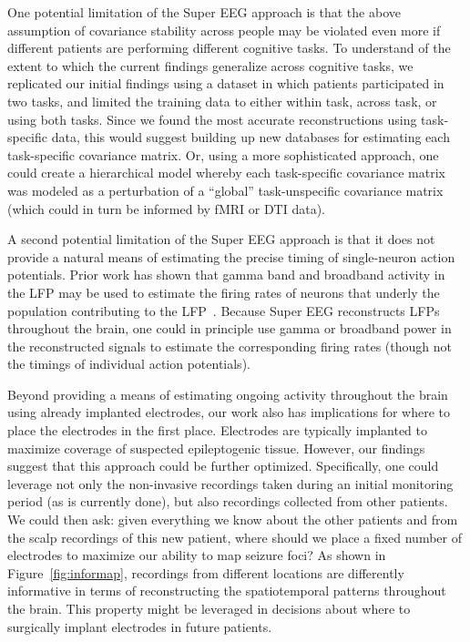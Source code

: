 \documentclass[12pt]{article}
\begin{document}
One potential limitation of the Super EEG approach is that the above
assumption of covariance stability across people may be violated even
more if different patients are performing different cognitive tasks.
To understand of the extent to which the current findings generalize across
cognitive tasks, we replicated our initial findings using a dataset in which patients participated in two tasks, and limited the training data to either within task, across task, or using both tasks. Since we found the most accurate reconstructions using task-specific data, this would suggest building up new databases for estimating each task-specific covariance
matrix.  Or, using a more sophisticated approach, one could create a
hierarchical model whereby each task-specific covariance matrix was
modeled as a perturbation of a ``global'' task-unspecific covariance
matrix (which could in turn be informed by fMRI or DTI data).

A second potential limitation of the Super EEG approach is that it
does not provide a natural means of estimating the precise timing of
single-neuron action potentials.  Prior work has shown that gamma band
and broadband activity in the LFP may be used to estimate the firing
rates of neurons that underly the population contributing to the
LFP~\cite{MannEtal09}.  Because Super EEG reconstructs LFPs throughout
the brain, one could in principle use gamma or broadband power in the
reconstructed signals to estimate the corresponding firing rates
(though not the timings of individual action potentials).

Beyond providing a means of estimating ongoing activity throughout the
brain using already implanted electrodes, our work also has
implications for where to place the electrodes in the first place.
Electrodes are typically implanted to maximize coverage of suspected
epileptogenic tissue.  However, our findings suggest that this approach
could be further optimized.  Specifically, one could leverage not only
the non-invasive recordings taken during an initial monitoring period
(as is currently done), but also recordings collected from other
patients.  We could then ask: given everything we know about the other
patients and from the scalp recordings of this new patient, where
should we place a fixed number of electrodes to maximize our ability
to map seizure foci?  As shown in Figure~\ref{fig:informap}, recordings
from different locations are differently informative in terms of
reconstructing the spatiotemporal patterns throughout the brain.
This property might be leveraged in decisions about where to
surgically implant electrodes in future patients.
\end{document}
